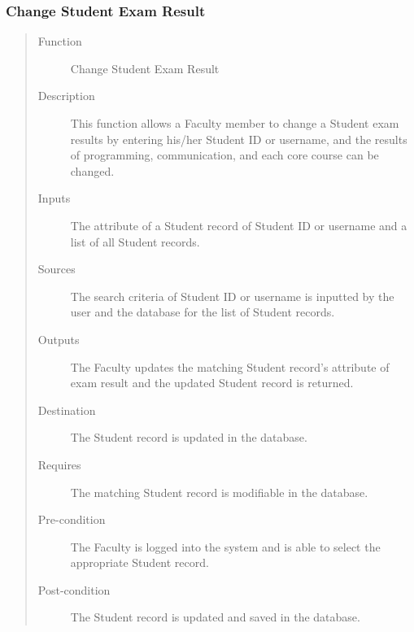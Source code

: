 \subsubsection{Change Student Exam Result }
\begin{quote} %
\begin{description}
\item[Function]
   Change Student Exam Result
\item[Description]
   This function allows a Faculty member to change a Student exam results by
   entering his/her Student ID or username, and the results of programming,
   communication, and each core course can be changed.
\item[Inputs]
   The attribute of a Student record of Student ID or username and a list of all
   Student records.
\item[Sources]
   The search criteria of Student ID or username is inputted by the user and the
   database for the list of Student records.
\item[Outputs]
   The Faculty updates the matching Student record's attribute of exam result
   and the updated Student record is returned.
\item[Destination]
   The Student record is updated in the database.
\item[Requires]
   The matching Student record is modifiable in the database.
\item[Pre-condition]
   The Faculty is logged into the system and is able to select the appropriate
   Student record.
\item[Post-condition]
   The Student record is updated and saved in the database.
\end{description}
\end{quote} %

